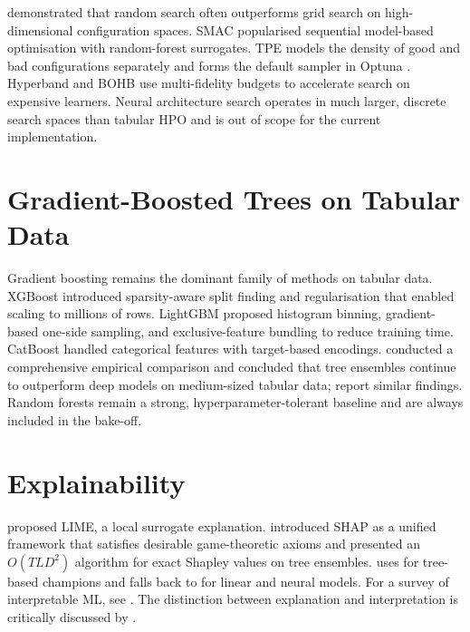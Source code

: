\citet{bergstra2012random} demonstrated that random search often
outperforms grid search on high-dimensional configuration spaces.
SMAC \citep{hutter2011smac} popularised sequential model-based
optimisation with random-forest surrogates. TPE
\citep{bergstra2011algorithms} models the density of good and bad
configurations separately and forms the default sampler in Optuna
\citep{akiba2019optuna}. Hyperband \citep{li2017hyperband} and BOHB
\citep{falkner2018bohb} use multi-fidelity budgets to accelerate
search on expensive learners. Neural architecture search
\citep{zoph2017nas, real2019regularized, elsken2019nas} operates in
much larger, discrete search spaces than tabular HPO and is out of
scope for the current \projname{} implementation.

\section{Gradient-Boosted Trees on Tabular Data}
\label{sec:lit-tabular}

Gradient boosting \citep{friedman2001greedy} remains the dominant
family of methods on tabular data. XGBoost \citep{chen2016xgboost}
introduced sparsity-aware split finding and regularisation that
enabled scaling to millions of rows. LightGBM \citep{ke2017lightgbm}
proposed histogram binning, gradient-based one-side sampling, and
exclusive-feature bundling to reduce training time. CatBoost
\citep{prokhorenkova2018catboost} handled categorical features with
target-based encodings. \citet{grinsztajn2022trees} conducted a
comprehensive empirical comparison and concluded that tree ensembles
continue to outperform deep models on medium-sized tabular data;
\citet{borisov2022deep} report similar findings. Random forests
\citep{breiman2001rf} remain a strong, hyperparameter-tolerant
baseline and are always included in the \projname{} bake-off.

\section{Explainability}
\label{sec:lit-xai}

\citet{ribeiro2016lime} proposed LIME, a local surrogate
explanation. \citet{lundberg2017shap} introduced SHAP as a unified
framework that satisfies desirable game-theoretic axioms and
\citet{lundberg2020treeshap} presented an $O(TL D^{2})$ algorithm
for exact Shapley values on tree ensembles. \projname{} uses
 for tree-based champions and falls back to
 for linear and neural models. For a survey
of interpretable ML, see \citet{molnar2022ibm}. The distinction
between explanation and interpretation is critically discussed by
\citet{rudin2019stop}.

